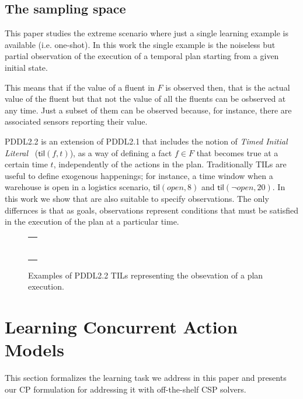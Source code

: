 \documentclass{ecai}
\newcommand{\til}{\mathsf{til}}    %
\begin{document}
\subsection{The sampling space}
\label{sec:sampling-space}
This paper studies the extreme scenario where just a single learning example is available (i.e. one-shot). In this work the single example is the noiseless but partial observation of the execution of a temporal plan starting from a given initial state.

This means that if the value of a fluent in $F$ is observed then, that is the actual value of the fluent but that not the value of all the fluents can be osbserved at any time. Just a subset of them can be observed because, for instance, there are associated sensors reporting their value.

PDDL2.2 is an extension of PDDL2.1 that includes the notion of {\em Timed Initial Literal}~\cite{hoffmann2005} ($\til(f,t)$), as a way of defining a fact $f\in F$ that becomes true at a certain time $t$, independently of the actions in the plan. Traditionally TILs are useful to define exogenous happenings; for instance, a time window when a warehouse is open in a logistics scenario, $\til(open,8)$ and $\til(\neg open,20)$. In this work we show that are also suitable to specify observations. The only differnces is that as goals, observations represent conditions that must be satisfied in the execution of the plan at a particular time.

\begin{figure}
  \begin{tabular}{p{\textwidth}}
\begin{tiny}    
\begin{verbatim}

\end{verbatim}
\end{tiny}    
\end{tabular}
\caption{\small Examples of PDDL2.2 TILs representing the obsevation of a plan execution.}
\label{fig:exampletils}
\end{figure}



\section{Learning Concurrent Action Models}
This section formalizes the learning task we address in this paper and presents our CP formulation for addressing it with off-the-shelf CSP solvers.
\end{document}
